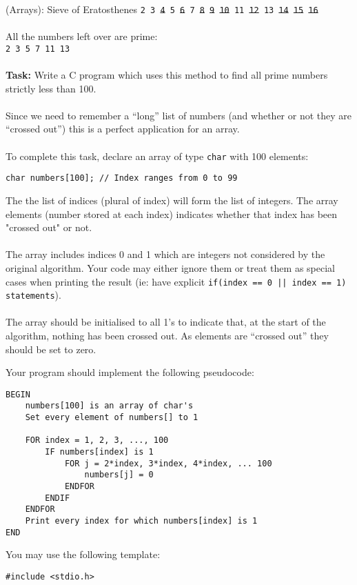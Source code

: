 \documentclass{lab}
\begin{document}
\begin{task}{(Arrays): Sieve of Eratosthenes}{}
\texttt{2 3 \st{4} 5 \st{6} 7 \st{8} \st{9} \st{10} 11 \st{12} 13 \st{14} \st{15} \st{16}}
\\~\\
All the numbers left over are prime:\\
\texttt{2 3 5 7 11 13}
\\~\\
\textbf{Task:} Write a C program which uses this method to find all prime numbers strictly less than 100.
\\~\\
Since we need to remember a ``long'' list of numbers (and whether or not they are ``crossed out'') this is a perfect application for an array.
\\~\\
To complete this task, declare an array of type \texttt{char} with 100 elements:
\begin{lstlisting}[style=Ctable]
char numbers[100]; // Index ranges from 0 to 99
\end{lstlisting}
The the list of indices (plural of index) will form the list of integers. The array elements (number stored at each index) indicates whether that index has been "crossed out" or not.
\\~\\
The array includes indices 0 and 1 which are integers not considered by the original algorithm. Your code may either ignore them or treat them as special cases when printing the result (ie: have explicit \texttt{if(index == 0 || index == 1) statements}).
\\~\\
The array should be initialised to all 1's to indicate that, at the start of the algorithm, nothing has been crossed out. As elements are ``crossed out'' they should be set to zero.

\pagebreak
Your program should implement the following pseudocode:
\begin{lstlisting}[style=pseudo]
BEGIN
	numbers[100] is an array of char's
	Set every element of numbers[] to 1
	
	FOR index = 1, 2, 3, ..., 100
		IF numbers[index] is 1
			FOR j = 2*index, 3*index, 4*index, ... 100
				numbers[j] = 0
			ENDFOR
		ENDIF
	ENDFOR
	Print every index for which numbers[index] is 1
END
\end{lstlisting}

You may use the following template:
\begin{lstlisting}[style=Ctable]
#include <stdio.h>


\end{lstlisting}
\end{task}
\end{document}
